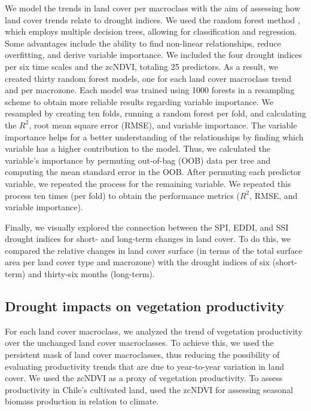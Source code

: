 \documentclass[
  authoryear,
  preprint,
  3p,
  onecolumn]{elsarticle}
\begin{document}
We model the trends in land cover per macroclass with the aim of
assessing how land cover trends relate to drought indices. We used the
random forest method \citep{Ho1995}, which employs multiple decision
trees, allowing for classification and regression. Some advantages
include the ability to find non-linear relationships, reduce
overfitting, and derive variable importance. We included the four
drought indices per six time scales and the zcNDVI, totaling 25
predictors. As a result, we created thirty random forest models, one for
each land cover macroclass trend and per macrozone. Each model was
trained using 1000 forests in a resampling scheme to obtain more
reliable results regarding variable importance. We resampled by creating
ten folds, running a random forest per fold, and calculating the
\(R^2\), root mean square error (RMSE), and variable importance. The
variable importance helps for a better understanding of the
relationships by finding which variable has a higher contribution to the
model. Thus, we calculated the variable's importance by permuting
out-of-bag (OOB) data per tree and computing the mean standard error in
the OOB. After permuting each predictor variable, we repeated the
process for the remaining variable. We repeated this process ten times
(per fold) to obtain the performance metrics (\(R^2\), RMSE, and
variable importance).

Finally, we visually explored the connection between the SPI, EDDI, and
SSI drought indices for short- and long-term changes in land cover. To
do this, we compared the relative changes in land cover surface (in
terms of the total surface area per land cover type and macrozone) with
the drought indices of six (short-term) and thirty-six months
(long-term).

\subsection{Drought impacts on vegetation
productivity}\label{drought-impacts-on-vegetation-productivity}

For each land cover macroclass, we analyzed the trend of vegetation
productivity over the unchanged land cover macroclasses. To achieve
this, we used the persistent mask of land cover macroclasses, thus
reducing the possibility of evaluating productivity trends that are due
to year-to-year variation in land cover. We used the zcNDVI as a proxy
of vegetation productivity. To assess productivity in Chile's cultivated
land, \citet{Zambrano2018} used the zcNDVI for assessing seasonal
biomass production in relation to climate.
\end{document}
